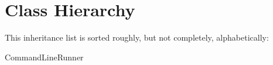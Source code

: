 \section{Class Hierarchy}
This inheritance list is sorted roughly, but not completely, alphabetically\+:\begin{DoxyCompactList}
\item Command\+Line\+Runner\begin{DoxyCompactList}
\item {}
\end{DoxyCompactList}
\end{DoxyCompactList}
